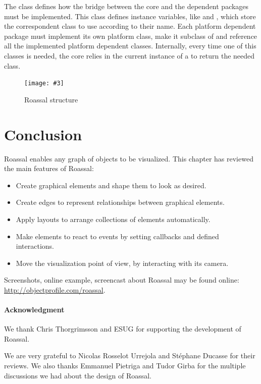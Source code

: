\documentclass[a4paper,10pt,twoside]{book}
\newcommand{\fig}[4]{
		\begin{figure}[#1]
			\centering
			\texttt{[image: \#3]}
			\caption{\label{fig:#3}#4}
		\end{figure}}
\begin{document}
The  class defines how the bridge between the core and the dependent packages must be implemented. This class defines instance variables, like  and , which store the correspondent class to use according to their name. Each platform dependent package must implement its own platform class, make it subclass of  and reference all the implemented platform dependent classes.
Internally, every time one of this classes is needed, the core relies in the current instance of a  to return the needed class.

\fig{H}{0.3}{structure}{Roassal structure}


\section{Conclusion}

Roassal enables any graph of objects to be visualized. This chapter has reviewed the main features of Roassal:

\begin{itemize}
\item Create graphical elements and shape them to look as desired.
\item Create edges to represent relationships between graphical elements.
\item Apply layouts to arrange collections of elements automatically.
\item Make elements to react to events by setting callbacks and defined interactions.
\item Move the visualization point of view, by interacting with its camera.
\end{itemize}

Screenshots, online example, screencast about Roassal may be found online: \url{http://objectprofile.com/roassal}.

\paragraph{Acknowledgment}
We thank Chris Thorgrimsson and ESUG for supporting the development of Roassal.

We are very grateful to Nicolas Rosselot Urrejola and St\'ephane Ducasse for their reviews. We also thanks Emmanuel Pietriga and Tudor Girba for the multiple discussions we had about the design of Roassal. 

%
%


\ifx\wholebook\relax\else
   
   
\end{document}
